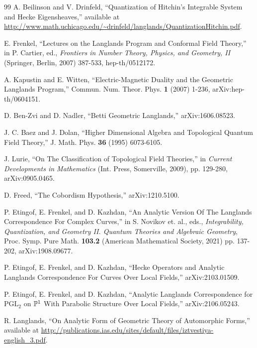 \documentclass[11pt,a4paper]{article}
\begin{document}
 


 

\begin{thebibliography}{99}
A. Beilinson and V. Drinfeld, ``Quantization of Hitchin's
Integrable System and Hecke Eigensheaves,''
available at \url{http://www.math.uchicago.edu/~drinfeld/langlands/QuantizationHitchin.pdf}.

E. Frenkel, ``Lectures on the Langlands Program and Conformal Field Theory,'' in P. Cartier, ed., {\it Frontiers in Number Theory,
Physics, and Geometry, II} (Springer, Berlin, 2007) 387-533, hep-th/0512172.

A. Kapustin and E. Witten, 
``Electric-Magnetic Duality and the Geometric Langlands Program,''   Commun. Num. Theor. Phys.
{\bf 1} (2007) 1-236,
arXiv:hep-th/0604151.

 D. Ben-Zvi and D. Nadler, ``Betti Geometric Langlands,'' arXiv:1606.08523.

J. C. Baez and J. Dolan, ``Higher Dimensional Algebra
and Topological Quantum Field Theory,'' J. Math. Phys. {\bf 36} (1995) 6073-6105.

J. Lurie, ``On The Classification of Topological Field Theories,''
in {\it Current Developments in Mathematics} (Int. Press, Somerville, 2009), pp. 129-280, arXiv:0905.0465.

 D. Freed, ``The Cobordism Hypothesis,''  arXiv:1210.5100.

P. Etingof, E. Frenkel, and D. Kazhdan, ``An Analytic Version Of The Langlands Correspondence For Complex Curves,''  in S. Novikov et. al., eds.,
{\it Integrability, Quantization, and Geometry II. Quantum Theories and Algebraic Geometry}, Proc. Symp. Pure Math. {\bf 103.2} (American
Mathematical Society, 2021) pp. 137-202,
arXiv:1908.09677.

P. Etingof, E. Frenkel, and D. Kazhdan, ``Hecke Operators and Analytic Langlands Correspondence For Curves Over Local Fields,''
arXiv:2103.01509.

P. Etingof, E. Frenkel, and D. Kazhdan, ``Analytic Langlands Correspondence for $\mathrm{PGL}_2$ on ${\Bbb P}^1$ With Parabolic
Structure Over Local Fields,'' arXiv:2106.05243.

R. Langlands, ``On Analytic Form of Geometric Theory of Automorphic Forms,'' available at
\url{http://publications.ias.edu/sites/default/files/iztvestiya-english_3.pdf}.



\end{thebibliography}
\end{document}
